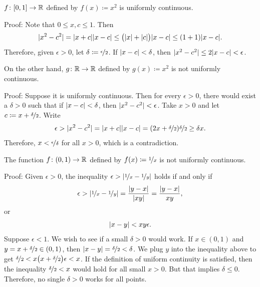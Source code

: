 \begin{example}
$f \colon [0,1] \to {\mathbb{R}}$ defined by $f(x) \coloneqq x^2$ is uniformly continuous.

Proof: Note that $0 \leq x,c \leq 1$.  Then
\begin{equation*}
\lvert {x^2-c^2} \rvert = \lvert {x+c} \rvert\lvert {x-c} \rvert
\leq \bigl(\lvert {x} \rvert+\lvert {c} \rvert\bigr) \lvert {x-c} \rvert
\leq (1+1)\lvert {x-c} \rvert .
\end{equation*}
Therefore, given $\epsilon > 0$, let $\delta \coloneqq \nicefrac{\epsilon}{2}$.
If $\lvert {x-c} \rvert < \delta$, then $\lvert {x^2-c^2} \rvert \leq 2 \lvert {x-c} \rvert < \epsilon$.

\medskip

On the other hand, $g \colon {\mathbb{R}} \to {\mathbb{R}}$ defined by $g(x) \coloneqq x^2$ is not uniformly
continuous.

Proof: Suppose it is uniformly continuous.
Then for every $\epsilon > 0$,
there would exist a $\delta > 0$ such that
if $\lvert {x-c} \rvert < \delta$, then $\lvert {x^2 -c^2} \rvert < \epsilon$.
Take $x > 0$ and let
$c \coloneqq x+\nicefrac{\delta}{2}$.  Write
\begin{equation*}
\epsilon >
\lvert {x^2-c^2} \rvert = \lvert {x+c} \rvert\lvert {x-c} \rvert
=
(2x+\nicefrac{\delta}{2})\nicefrac{\delta}{2} 
\geq 
\delta x .
\end{equation*}
Therefore, $x < \nicefrac{\epsilon}{\delta}$ for all $x > 0$, which is a
contradiction.
\end{example}


\begin{example}
The function $f \colon (0,1) \to {\mathbb{R}}$ defined by $f(x) \coloneqq \nicefrac{1}{x}$ is not
uniformly continuous.

Proof: Given $\epsilon > 0$, the inequality $\epsilon >
\left\lvert {\nicefrac{1}{x}-\nicefrac{1}{y}} \right\rvert$ holds if and only if
\begin{equation*}
\epsilon >
\left\lvert {\nicefrac{1}{x}-\nicefrac{1}{y}} \right\rvert
=
\frac{\lvert {y-x} \rvert}{\lvert {xy} \rvert} 
=
\frac{\lvert {y-x} \rvert}{xy} ,
\end{equation*}
or
\begin{equation*}
\lvert {x-y} \rvert < xy \epsilon .
\end{equation*}
Suppose $\epsilon < 1$.
We wish to see if a 
small $\delta > 0$ would work.
If $x \in (0,1)$ and 
$y = x+\nicefrac{\delta}{2} \in (0,1)$,
then $\lvert {x-y} \rvert = \nicefrac{\delta}{2} < \delta$.
We plug $y$ into the inequality above to get $\nicefrac{\delta}{2} <
x \bigl( x+\nicefrac{\delta}{2} \bigr) \epsilon < x$.
If the definition of uniform continuity is satisfied, then
the inequality $\nicefrac{\delta}{2} < x$ would hold for all small $x > 0$.
But that implies $\delta \leq 0$.
Therefore, no single $\delta > 0$ works for all points.
\end{example}

